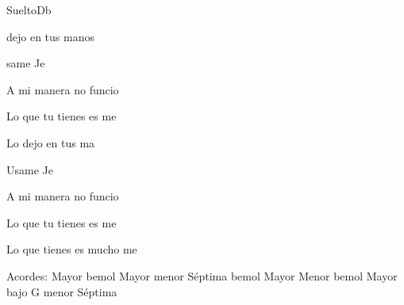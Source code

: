\documentclass[12pt, spanish]{book}
\begin{document}
\begin{song}{Suelto}{Db}
        \begin{SBOpGroup}
             dejo en tus manos

            same Je

            A mi manera no funcio

            Lo que tu tienes es me

            Lo dejo en tus ma

            Usame Je

            A mi manera no funcio

            Lo que tu tienes es me

            Lo que  tienes es mucho me
        \end{SBOpGroup}

        \ifChordBk
        \begin{SBOpGroup}
            Acordes:\break
             Mayor  \hfill
             bemol Mayor \hfill\null\break
             menor S\'eptima \hfill
             bemol Mayor \hfill\null\break
             Menor \hfill
             bemol Mayor bajo G \hfill\null\break
             menor S\'eptima \hfill\null\break
        \end{SBOpGroup}
        \fi
    \end{song}
\end{document}
